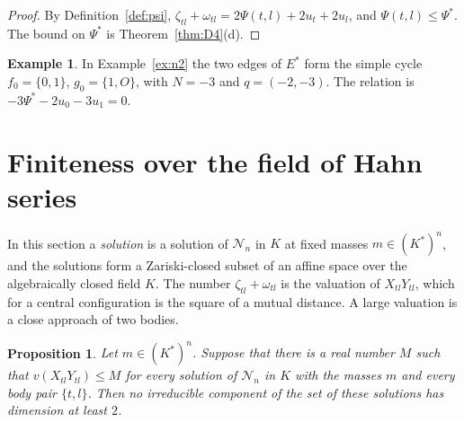 \documentclass[11pt]{amsart}
\newtheorem{proposition}[theorem]{Proposition}
\theoremstyle{definition}
\newtheorem{example}[theorem]{Example}
\theoremstyle{remark}
\numberwithin{equation}{section}
\newcommand{\cN}{\mathcal{N}}
\newcommand{\Ps}{\Psi^{*}}
\newcommand{\Es}{E^{*}}
\begin{document}
\begin{proof}
By Definition~\ref{def:psi}, $\zeta_{tl} + \omega_{tl} = 2\Psi(t, l) + 2u_t + 2u_l$, and
$\Psi(t, l) \le \Ps$. The bound on $\Ps$ is Theorem~\ref{thm:D4}(d).
\end{proof}

\begin{example}\label{ex:n2cycle}
In Example~\ref{ex:n2} the two edges of $\Es$ form the simple cycle $f_0 = \{0, 1\}$, $g_0 = \{1, O\}$,
with $N = -3$ and $q = (-2, -3)$. The relation is $-3\Ps - 2u_0 - 3u_1 = 0$.
\end{example}

\section{Finiteness over the field of Hahn series}\label{sec:K}

In this section a \emph{solution} is a solution of $\cN_n$ in $K$ at fixed masses $m \in (K^{*})^n$, and
the solutions form a Zariski-closed subset of an affine space over the algebraically closed field $K$.
The number $\zeta_{tl} + \omega_{tl}$ is the valuation of $X_{tl} Y_{tl}$, which for a central
configuration is the square of a mutual distance. A large valuation is a close approach of two bodies.

\begin{proposition}\label{prop:D2}
Let $m \in (K^{*})^n$. Suppose that there is a real number $M$ such that
$v(X_{tl} Y_{tl}) \le M$ for every solution of $\cN_n$ in $K$ with the masses $m$ and every body pair
$\{t, l\}$. Then no irreducible component of the set of these solutions has dimension at least $2$.
\end{proposition}
\end{document}
